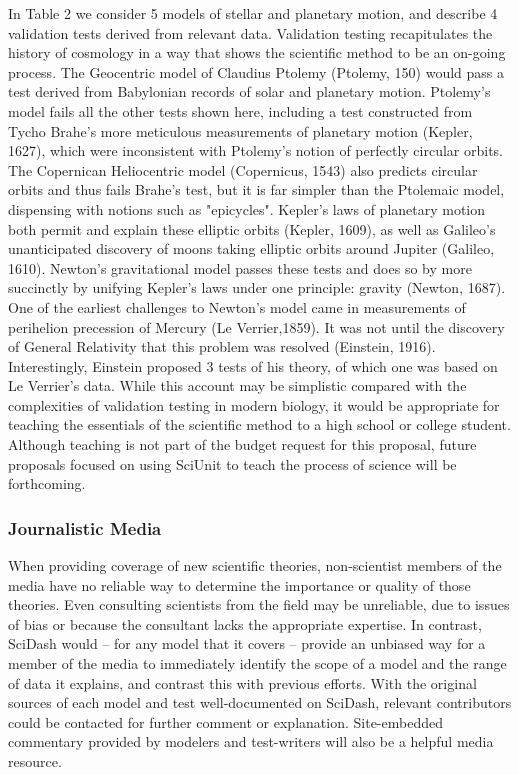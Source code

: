 \documentclass[11pt,letterpaper]{article}
\begin{document}
In Table 2 we consider 5 models of stellar and planetary motion, and describe 4 validation tests derived from relevant data.  Validation testing recapitulates the history of cosmology in a way that shows the scientific method to be an on-going process.  The Geocentric model of Claudius Ptolemy (Ptolemy, 150) would pass a test derived from Babylonian records of solar and planetary motion.  Ptolemy's model fails all the other tests shown here, including a test constructed from Tycho Brahe's more meticulous measurements of planetary motion (Kepler, 1627), which were inconsistent with Ptolemy's notion of perfectly circular orbits.  The Copernican Heliocentric model (Copernicus, 1543) also predicts circular orbits and thus fails Brahe's test, but it is far simpler than the Ptolemaic model, dispensing with notions such as "epicycles".  Kepler's laws of planetary motion both permit and explain these elliptic orbits (Kepler, 1609), as well as Galileo's unanticipated discovery of moons taking elliptic orbits around Jupiter (Galileo, 1610).  Newton's gravitational model passes these tests and does so by more succinctly by unifying Kepler's laws under one principle: gravity (Newton, 1687).  One of the earliest challenges to Newton's model came in measurements of perihelion precession of Mercury (Le Verrier,1859).  It was not until the discovery of General Relativity that this problem was resolved (Einstein, 1916).  Interestingly, Einstein proposed 3 tests of his theory, of which one was based on Le Verrier's data.  While this account may be simplistic compared with the complexities of validation testing in modern biology, it would be appropriate for teaching the essentials of the scientific method to a high school or college student.  Although teaching is not part of the budget request for this proposal, future proposals focused on using SciUnit to teach the process of science will be forthcoming.  

\subsubsection{Journalistic Media}
When providing coverage of new scientific theories, non-scientist members of the media have no reliable way to determine the importance or quality of those theories.  Even consulting scientists from the field may be unreliable, due to issues of bias or because the consultant lacks the appropriate expertise.  In contrast, SciDash would -- for any model that it covers -- provide an unbiased way for a member of the media to immediately identify the scope of a model and the range of data it explains, and contrast this with previous efforts.  With the original sources of each model and test well-documented on SciDash, relevant contributors could be contacted for further comment or explanation.  Site-embedded commentary provided by modelers and test-writers will also be a helpful media resource.  
\end{document}
